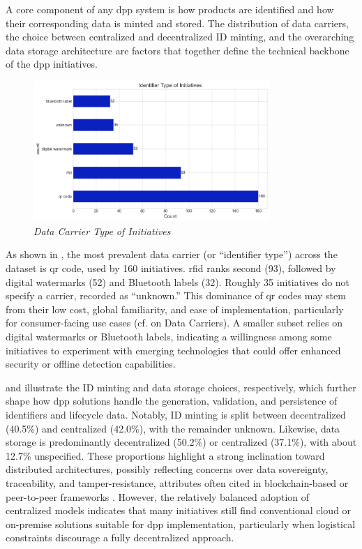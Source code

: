 A core component of any \ac{dpp} system is how products are identified and how their corresponding data is minted and stored. The distribution of data carriers, the choice between centralized and decentralized ID minting, and the overarching data storage architecture are factors that together define the technical backbone of the \ac{dpp} initiatives.

\begin{figure}[H]
  \centering
  \includegraphics[width=0.8\textwidth]{figures/initiatives_data_carrier.png}
  \caption{%
    \textit{Data Carrier Type of Initiatives} 
  }
  \label{fig:initiatives_data_carrier}
\end{figure}

As shown in , the most prevalent data carrier (or “identifier type”) across the dataset is \ac{qr} code, used by 160 initiatives. \ac{rfid} ranks second (93), followed by digital watermarks (52) and Bluetooth labels (32). Roughly 35 initiatives do not specify a carrier, recorded as “unknown.” This dominance of \ac{qr} codes may stem from their low cost, global familiarity, and ease of implementation, particularly for consumer-facing use cases (cf. on Data Carriers). A smaller subset relies on digital watermarks or Bluetooth labels, indicating a willingness among some initiatives to experiment with emerging technologies that could offer enhanced security or offline detection capabilities.

 and  illustrate the ID minting and data storage choices, respectively, which further shape how \ac{dpp} solutions handle the generation, validation, and persistence of identifiers and lifecycle data. Notably, ID minting is split between decentralized (40.5\%) and centralized (42.0\%), with the remainder unknown. Likewise, data storage is predominantly decentralized (50.2\%) or centralized (37.1\%), with about 12.7\% unspecified. These proportions highlight a strong inclination toward distributed architectures, possibly reflecting concerns over data sovereignty, traceability, and tamper-resistance, attributes often cited in blockchain-based or peer-to-peer frameworks \autocite{Narayanan.2016}. However, the relatively balanced adoption of centralized models indicates that many initiatives still find conventional cloud or on-premise solutions suitable for \ac{dpp} implementation, particularly when logistical constraints discourage a fully decentralized approach.

